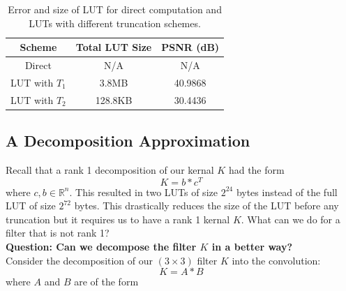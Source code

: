 \documentclass[12pt]{amsart}
\theoremstyle{definition}
\theoremstyle{remark}
\numberwithin{thm}{section}
\begin{document}
\begin{center}
\begin{table}
	 
    \begin{tabular}{ | c | c| c |}
    \hline
    Scheme & Total LUT Size & PSNR (dB) \\ \hline
    Direct & N/A & N/A  \\ \hline
    LUT with $T_1$ & 3.8MB & 40.9868 \\ \hline
    LUT with $T_2$ & 128.8KB & 30.4436 \\ \hline   
    \end{tabular}
    \bigskip
    
    \caption{Error and size of LUT for direct computation and LUTs with different truncation schemes.}
     \label{tbl:high_pass}
\end{table}
\end{center}



\subsection{A Decomposition Approximation}
Recall that a rank 1 decomposition of our kernal $K$ had the form $$
K=b*c^T
$$
where $c,b \in \mathbb{R}^n$. This resulted in two LUTs of size $2^{24}$ bytes instead of the full LUT of size $2^{72}$ bytes. This drastically reduces the size of the LUT before any truncation but it requires us to have a rank 1 kernal $K$. What can we do for a filter that is not rank 1?
\\
\textbf{Question: Can we decompose the filter $K$ in a better way?}
\\
Consider the decomposition of our $(3\times 3)$ filter $K$ into the convolution:
$$K=A*B$$
where $A$ and $B$ are of the form
\end{document}

